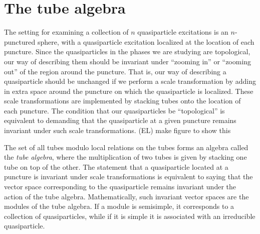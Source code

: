 \documentclass[12pt,a4paper]{article}
\newcommand{\zt}{\mathbb{Z}_2}
\newcommand{\ethan}[1]{{\color{amethyst}\footnotesize{(EL) #1}}}
\begin{document}




\section{The tube algebra}


The setting for examining a collection of $n$ quasiparticle excitations is an $n$-punctured sphere, with a quasiparticle excitation localized at the location of each puncture. 
Since the quasiparticles in the phases we are studying are topological, our way of describing them should be invariant under ``zooming in'' or ``zooming out'' of the region around the puncture. That is, our way of describing a quasiparticle should be unchanged if we perform a scale transformation by adding in extra space around the puncture on which the quasiparticle is localized. These scale transformations are implemented by stacking tubes onto the location of each puncture. The condition that our quasiparticles be ``topological'' is equivalent to demanding that the quasiparticle at a given puncture remains invariant under such scale transformations. \ethan{make figure to show this}


The set of all tubes modulo local relations on the tubes forms an algebra called the {\it tube algebra}, where the multiplication of two tubes is given by stacking one tube on top of the other. The statement that a quasiparticle located at a puncture is invariant under scale transformations is equivalent to saying that the vector space corresponding to the quasiparticle remains invariant under the action of the tube algebra. Mathematically, such invariant vector spaces are the modules of the tube algebra. If a module is semisimple, it corresponds to a collection of quasiparticles, while if it is simple it is associated with an irreducible quasiparticle. 
\end{document}
